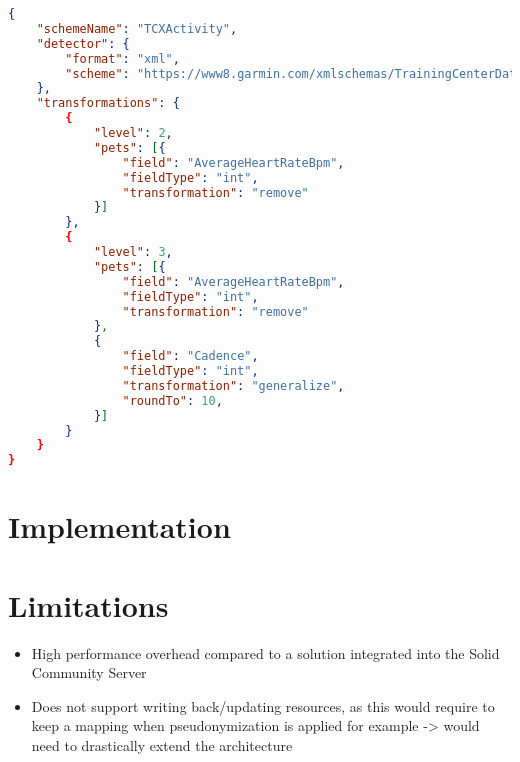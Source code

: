 \begin{lstlisting}[language=json]
{
    "schemeName": "TCXActivity",
    "detector": {
        "format": "xml",
        "scheme": "https://www8.garmin.com/xmlschemas/TrainingCenterDatabasev2",
    },
    "transformations": {
        {
            "level": 2,
            "pets": [{
                "field": "AverageHeartRateBpm",
                "fieldType": "int",
                "transformation": "remove"
            }]
        },
        {
            "level": 3,
            "pets": [{
                "field": "AverageHeartRateBpm",
                "fieldType": "int",
                "transformation": "remove"
            },
            {
                "field": "Cadence",
                "fieldType": "int",
                "transformation": "generalize",
                "roundTo": 10,
            }]
        }
    }
}
\end{lstlisting}


\section{Implementation}

\section{Limitations}
\begin{itemize}
    \item High performance overhead compared to a solution integrated into the Solid Community Server
    \item Does not support writing back/updating resources, as this would require to keep a mapping when pseudonymization is applied for example -> would need to drastically extend the architecture
    
\end{itemize}